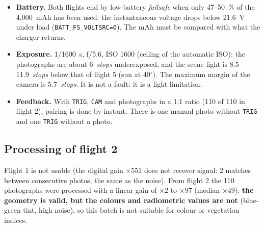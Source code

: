 \begin{itemize}
    \item \textbf{Battery.} Both flights end by low-battery \emph{failsafe} when only 47--50~\% of the 4,000~mAh has been used: the instantaneous voltage drops below 21.6~V under load (\texttt{BATT\_FS\_VOLTSRC=0}). The mAh must be compared with what the charger returns.
    \item \textbf{Exposure.} 1/1600~s, f/5.6, ISO 1600 (ceiling of the automatic ISO): the photographs are about 6~\emph{stops} underexposed, and the scene light is 8.5--11.9~\emph{stops} below that of flight 5 (sun at 40$^{\circ}$). The maximum margin of the camera is 5.7~\emph{stops}. It is not a fault: it is a light limitation.
    \item \textbf{Feedback.} With \texttt{TRIG}, \texttt{CAM} and photographs in a 1:1 ratio (110 of 110 in flight 2), pairing is done by instant. There is one manual photo without \texttt{TRIG} and one \texttt{TRIG} without a photo.
\end{itemize}


\subsection{Processing of flight 2}

Flight 1 is not usable (the digital gain $\times 551$ does not recover signal: 2 matches between consecutive photos, the same as the noise). From flight 2 the 110 photographs were processed with a linear gain of $\times 2$ to $\times 97$ (median $\times 49$); \textbf{the geometry is valid, but the colours and radiometric values are not} (blue-green tint, high noise), so this batch is not suitable for colour or vegetation indices.

